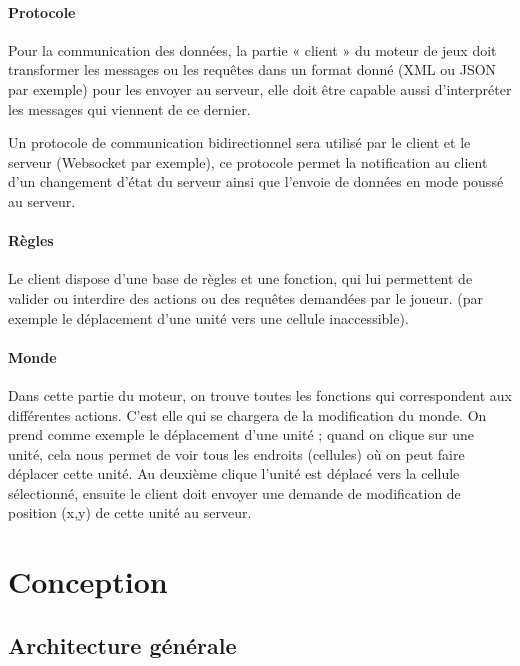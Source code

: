 \documentclass[a4paper,10pt]{report}
\begin{document}
        \subsubsection{Protocole}

          Pour la communication des données, la partie « client » du moteur de jeux doit transformer les messages ou les requêtes dans un format donné (XML ou JSON par exemple) pour les envoyer au serveur, elle doit être capable aussi d’interpréter les messages qui viennent de ce dernier.

          Un protocole de communication bidirectionnel sera utilisé par le client et le serveur (Websocket par exemple), ce protocole permet la notification au client d’un changement d’état du serveur ainsi que l’envoie de données en mode poussé au serveur.

        \subsubsection{Règles}

          Le client dispose d’une base de règles et une fonction, qui lui permettent de valider ou interdire des actions ou des requêtes demandées par le joueur. (par exemple le déplacement d’une unité vers une cellule inaccessible).

        \subsubsection{Monde}

          Dans cette partie du moteur, on trouve toutes les fonctions qui correspondent aux différentes actions. C'est elle qui se chargera de la modification du monde. On prend comme exemple le déplacement d’une unité ; quand on clique sur une unité, cela nous permet de voir tous les endroits (cellules) où on peut faire déplacer cette unité. Au deuxième clique l’unité est déplacé vers la cellule sélectionné, ensuite le client doit envoyer une demande de modification de position (x,y) de cette unité au serveur.



  \chapter{Conception}

    \section{Architecture générale}
\end{document}

